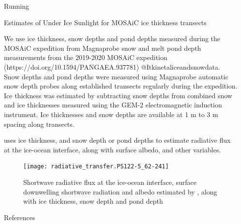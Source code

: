 \documentclass[final]{beamer}
\newlength{\sepwidth}
\newlength{\colwidth}
\newcommand{\separatorcolumn}{\begin{column}{\sepwidth}\end{column}}
\begin{document}
\begin{frame}[t,fragile]
\begin{columns}[t]
\begin{column}{\colwidth}
\begin{exampleblock}{Running }
    
  \end{exampleblock}

  \begin{block}{Estimates of Under Ice Sunlight for MOSAiC ice thickness transects}

    We use ice thickness, snow depths and pond depths measured during
    the MOSAiC expedition from Magnaprobe snow and melt pond depth
    measurements from the 2019-2020 MOSAiC expedition
    (https://doi.org/10.1594/PANGAEA.937781) @Itkinetaliceandsnowdata.
    Snow depths and pond depths were measured using Magnaprobe
    automatic snow depth probes along established transects regularly
    during the expedition.  Ice thickness was estimated by subtracting
    snow depths from combined snow and ice thicknesses measured using
    the GEM-2 electromagnetic induction instrument.  Ice thicknesses
    and snow depths are available at 1 m to 3 m spacing along
    transects.

     uses ice thickness, and snow depth or pond depths
    to estimate radiative flux at the ice-ocean interface, along with
    surface albedo, and other variables.

    \begin{figure}[h]
      \texttt{[image: radiative\_transfer.PS122-5\_62-241]}
      \caption{Shortwave radiative flux at the ice-ocean interface, surface downwelling shortwave radiation and albedo estimated by , along with ice thickness, snow depth and pond depth}
    \end{figure}
      

  \end{block}

  
  \begin{block}{References}

    \nocite{*}
    \footnotesize{}

  \end{block}

\end{column}
\separatorcolumn



\end{columns}
\end{frame}
\end{document}
